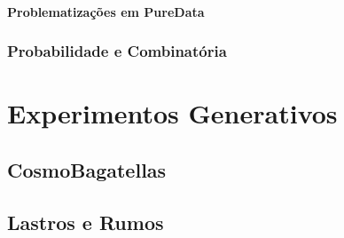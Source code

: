 \documentclass[
	12pt,				%
	openright,			%
	twoside,			%
	a4paper,			%
	english,			%
	french,				%
	spanish,			%
	brazil				%
	]{abntex2}
\begin{document}
\subsection{Problematizações em PureData}

\section{Probabilidade e Combinatória}




\part{Experimentos Generativos}

\chapter{CosmoBagatellas}


\chapter{Lastros e Rumos}





\postextual

%

%
%

\end{document}
